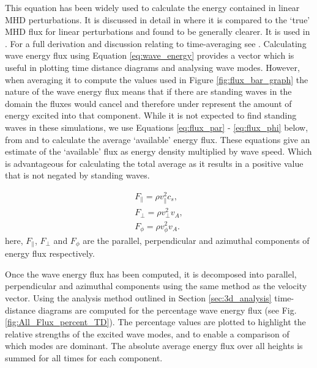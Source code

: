 This equation has been widely used to calculate the energy contained in linear MHD perturbations.
It is discussed in detail in \cite{bogdan2003} where it is compared to the `true' MHD flux for linear perturbations and found to be generally clearer. 
It is used in \cite{vigeesh2009, vigeesh2012, khomenko2012}. 
For a full derivation and discussion relating to time-averaging see \cite{leroy1985}.
Calculating wave energy flux using Equation \ref{eq:wave_energy} provides a vector which is useful in plotting time distance diagrams and analysing wave modes.
However, when averaging it to compute the values used in Figure \ref{fig:flux_bar_graph} the nature of the wave energy flux means that if there are standing waves in the domain the fluxes would cancel and therefore under represent the amount of energy excited into that component.
While it is not expected to find standing waves in these simulations, we use Equations \ref{eq:flux_par} - \ref{eq:flux_phi} below, from \citet{vigeesh2012} and \citet{khomenko2012} to calculate the average `available' energy flux.
These equations give an estimate of the `available' flux as energy density multiplied by wave speed.
Which is advantageous for calculating the total average as it results in a positive value that is not negated by standing waves.

\begin{align}
F_\parallel = \rho v_\parallel^2 c_s,\label{eq:flux_par}\\
F_\perp = \rho v_\perp^2 v_A,\label{eq:flux_perp}\\
F_\phi = \rho v_\phi^2v_A.\label{eq:flux_phi}
\end{align}
here, $F_\parallel$, $F_\perp$ and $F_\phi$ are the parallel, perpendicular and azimuthal components of energy flux respectively.

Once the wave energy flux has been computed, it is decomposed into parallel, perpendicular and azimuthal components using the same method as the velocity vector. 
Using the analysis method outlined in Section \ref{sec:3d_analysis} time-distance diagrams are computed for the percentage wave energy flux (see Fig. \ref{fig:All_Flux_percent_TD}). 
The percentage values are plotted to highlight the relative strengths of the excited wave modes, and to enable a comparison of which modes are dominant. 
The absolute average energy flux over all heights is summed for all times for each component.

%
%
%
%

